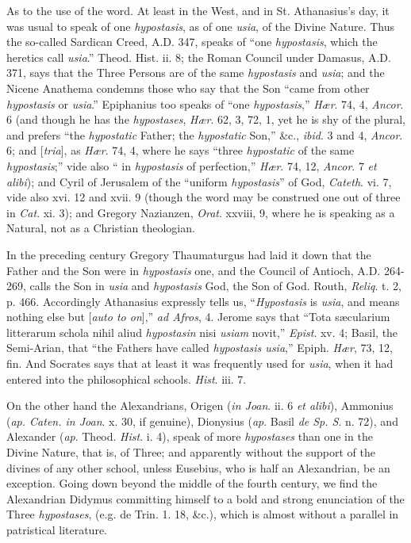 As to the use of the word. At least in the West, and in St.
Athanasius's day, it was usual to speak of one \emph{hypostasis}, as
of one \emph{usia}, of the Divine Nature. Thus the so-called Sardican
Creed, A.D. 347, speaks of ``one \emph{hypostasis},
which the heretics call \emph{usia}.'' Theod. Hist. ii. 8; the
Roman Council under Damasus, A.D. 371, says that
the Three Persons are of the same \emph{hypostasis} and \emph{usia};
and the Nicene Anathema condemns those who say that the Son ``came
from other \emph{hypostasis} or \emph{usia}.'' Epiphanius too
speaks of ``one \emph{hypostasis},'' \emph{Hær}. 74, 4, \emph{Ancor}.
6 (and though he has the \emph{hypostases}, \emph{Hær}. 62, 3, 72, 1,
yet he is shy of the plural, and prefers ``the \emph{hypostatic}
Father; the \emph{hypostatic} Son,'' \&c., \emph{ibid}. 3 and
4, \emph{Ancor}. 6; and [\emph{tria}], as \emph{Hær}. 74, 4, where he
says ``three \emph{hypostatic} of the same \emph{hypostasis};''
vide also `` in \emph{hypostasis} of perfection,'' \emph{Hær}.
74, 12, \emph{Ancor}. 7 \emph{et alibi}); and Cyril of Jerusalem of
the ``uniform \emph{hypostasis}'' of God, \emph{Cateth}. vi.
7, vide also xvi. 12 and xvii. 9 (though the word may be construed one
out of three in \emph{Cat}. xi. 3); and Gregory Nazianzen, \emph{Orat}.
xxviii, 9, where he is speaking as a Natural, not as a Christian
theologian.

In the preceding century Gregory Thaumaturgus had laid it down that
the Father and the Son were in \emph{hypostasis} one, and the Council
of Antioch, A.D. 264-269, calls the Son in \emph{usia}
and \emph{hypostasis} God, the Son of God. Routh, \emph{Reliq}. t. 2,
p. 466. Accordingly Athanasius expressly tells us, ``\emph{Hypostasis}
is \emph{usia}, and means nothing else but [\emph{auto to on}],'' \emph{ad
Afros}, 4. Jerome says that ``Tota sæcularium litterarum
schola nihil aliud \emph{hypostasin} nisi \emph{usiam} novit,'' \emph{Epist}.
xv. 4; Basil, the Semi-Arian, that ``the Fathers have called \emph{hypostasis
usia},'' Epiph. \emph{Hær}, 73, 12, fin. And Socrates says
that at least it was frequently used for \emph{usia}, when it had
entered into the philosophical schools. \emph{Hist}. iii. 7.

On the other hand the Alexandrians, Origen (\emph{in Joan}. ii. 6 \emph{et
alibi}), Ammonius (\emph{ap. Caten. in Joan}. x. 30, if genuine),
Dionysius (\emph{ap}. Basil \emph{de Sp. S}. n. 72), and Alexander (\emph{ap}.
Theod. \emph{Hist}. i. 4), speak of more \emph{hypostases} than one in
the Divine Nature, that is, of Three; and apparently without the
support of the divines of any other school, unless Eusebius, who is
half an Alexandrian, be an exception. Going down beyond the middle of
the fourth century, we find the Alexandrian Didymus committing himself
to a bold and strong enunciation of the Three \emph{hypostases}, (e.g.
de Trin. 1. 18, \&c.), which is almost without a parallel in
patristical literature.

